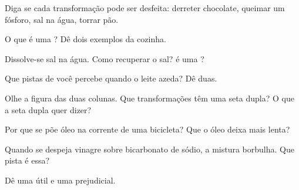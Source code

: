 \begin{exercise}[$\star$]\label{exo:g5:irreversible-changes:1}
Diga se cada transformação pode ser desfeita: derreter chocolate,
queimar um fósforo,  sal na água, torrar pão.
\end{exercise}

\begin{exercise}[$\star$]\label{exo:g5:irreversible-changes:2}
O que é uma ? Dê dois exemplos da cozinha.
\end{exercise}

\begin{exercise}[$\star$]\label{exo:g5:irreversible-changes:3}
Dissolve-se sal na água. Como recuperar o sal?  é uma
?
\end{exercise}

\begin{exercise}[$\star$]\label{exo:g5:irreversible-changes:4}
Que pistas de  você percebe quando o leite azeda?
Dê duas.
\end{exercise}

\begin{exercise}[$\star$]\label{exo:g5:irreversible-changes:5}
Olhe a figura das duas colunas. Que transformações têm uma seta dupla?
O que a seta dupla quer dizer?
\end{exercise}

\begin{exercise}[$\star$]\label{exo:g5:irreversible-changes:6}
Por que se põe óleo na corrente de uma bicicleta? Que  o óleo deixa mais lenta?
\end{exercise}

\begin{exercise}[$\star$]\label{exo:g5:irreversible-changes:7}
Quando se despeja vinagre sobre bicarbonato de sódio, a mistura
borbulha. Que pista é essa?
\end{exercise}

\begin{exercise}[$\star$]\label{exo:g5:irreversible-changes:8}
Dê uma  útil e uma 
prejudicial.
\end{exercise}

